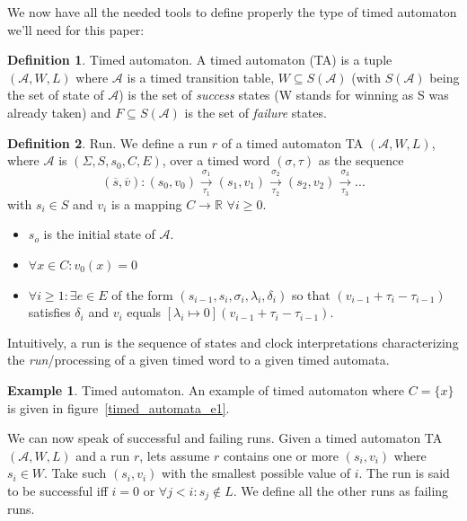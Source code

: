 \documentclass[12pt]{article}
\theoremstyle{definition}
\newtheorem{definition}{Definition}[section]
\theoremstyle{definition}
\newtheorem{example}{Example}[section]
\newcommand{\R}{\mathbb{R}}
\newcommand{\A}{\mathcal{A}}
\begin{document}
We now have all the needed tools to define properly the type of timed automaton we'll need for this paper:

\theoremstyle{definition}
\begin{definition}{Timed automaton.} A timed automaton (TA) is a tuple $(\A, W, L)$ where $\A$ is a timed transition table, $W \subseteq S(\A)$ (with $S(\A)$ being the set of state of $\A$) is the set of \textit{success} states (W stands for winning as S was already taken) and $F \subseteq S(\A)$ is the set of \textit{failure} states.
\end{definition}

\theoremstyle{definition}
\begin{definition}{Run.} We define a run $r$ of a timed automaton TA $(\A, W, L)$, where $\A$ is $(\Sigma, S, s_{0},C, E)$, over a timed word $(\sigma, \tau)$ as the sequence
$$(\overline{s}, \overline{v}): (s_0, v_0) \xrightarrow[\tau_1]{\sigma_1} (s_1, v_1) \xrightarrow[\tau_2]{\sigma_2} (s_2, v_2) \xrightarrow[\tau_3]{\sigma_3} ...$$
with $s_i \in S$ and $v_i$ is a mapping $C \to \R$ $\forall i \ge 0$.
\begin{itemize}
\item $s_o$ is the initial state of $\A$.
\item $\forall x \in C: v_0(x) = 0$
\item $\forall i \ge 1: \exists e \in E$ of the form $(s_{i-1}, s_i, \sigma_i, \lambda_i, \delta_i)$ so that $(v_{i-1} + \tau_i - \tau_{i-1})$ satisfies $\delta_i$ and $v_i$ equals $[\lambda_i \mapsto 0](v_{i-1} + \tau_i - \tau_{i-1})$.~\cite{ALUR1994183}
\end{itemize}
\end{definition}

Intuitively, a run is the sequence of states and clock interpretations characterizing the \textit{run}/processing of a given timed word to a given timed automata.

\theoremstyle{definition}
\begin{example}{Timed automaton.} An example of timed automaton where $C = \{x\}$ is given in figure~\ref{timed_automata_e1}.
\end{example}

We can now speak of successful and failing runs. Given a timed automaton TA $(\A, W, L)$ and a run $r$, lets assume $r$ contains one or more $(s_i, v_i)$ where $s_i \in W$. Take such $(s_i, v_i)$ with the smallest possible value of $i$. The run is said to be successful iff $i = 0$ or $\forall j < i: s_j \notin L$. We define all the other runs as failing runs.
\end{document}
